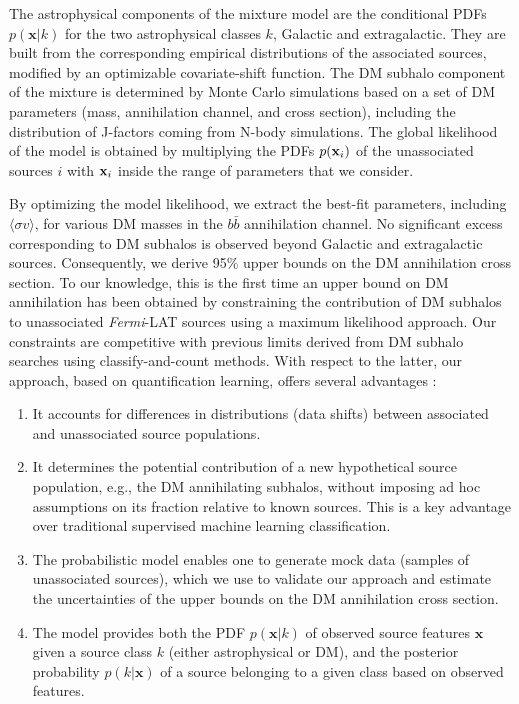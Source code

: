\documentclass[12pt, a4paper]{article}
\newcommand{\Fermi}{{\textit{Fermi}}}
\newcommand{\sigmav}{\langle \sigma v \rangle}
\begin{document}
The astrophysical components of the mixture model are the conditional PDFs $p(\mathbf{x}|k)$ for the two astrophysical classes $k$, Galactic and extragalactic.
They are built from the corresponding empirical distributions of the associated sources, modified by an optimizable covariate-shift function. The DM subhalo component of the mixture is determined by Monte Carlo simulations based on a set of DM parameters (mass, annihilation channel, and cross section), including the distribution of J-factors coming from N-body simulations. The global likelihood of the model is obtained by multiplying the PDFs $p({\bf x}_i)$ of the unassociated sources $i$ with ${\bf x}_i$ inside the range of parameters that we consider. 

By optimizing the model likelihood, we extract the best-fit parameters, including $\sigmav$, for various DM masses in the $b\bar{b}$ annihilation channel.
No significant excess corresponding to DM subhalos is observed beyond Galactic and extragalactic sources.
Consequently, we derive 95\% upper bounds on the DM annihilation cross section. To our knowledge, this is the first time an upper bound on DM annihilation has been obtained by constraining the contribution of DM subhalos to unassociated \Fermi-LAT sources using a maximum likelihood approach.
Our constraints are competitive with previous limits derived from DM subhalo searches using classify-and-count methods.
With respect to the latter, our approach, based on quantification learning, offers several advantages :
\begin{enumerate}[label=(\roman*)]
    \item It accounts for differences in distributions (data shifts) between associated and unassociated source populations.
    \item It determines the potential contribution of a new hypothetical source population, e.g., the DM annihilating subhalos, without imposing ad hoc assumptions on its fraction relative to known sources. This is a key advantage over traditional supervised machine learning classification.
    \item The probabilistic model enables one to generate mock data (samples of unassociated sources), which we use to validate our approach and estimate the uncertainties of the upper bounds on the DM annihilation cross section. 
    \item The model provides both the PDF $p(\mathbf{x}|k)$ of observed source features $\mathbf{x}$ given a source class $k$ (either astrophysical or DM), and the posterior probability $p(k|\mathbf{x})$ of a source belonging to a given class based on observed features.
\end{enumerate}
\end{document}

